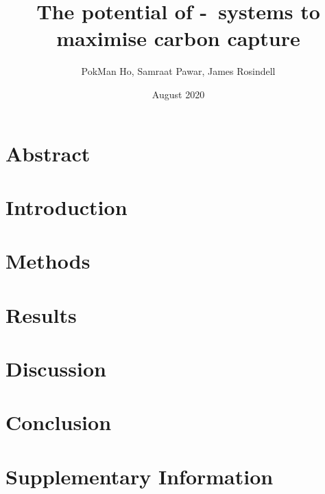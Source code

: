 \documentclass[sec/env.tex]{subfiles}
\title{The potential of \phy-\bac\ systems to maximise carbon capture}
\author{PokMan Ho, Samraat Pawar, James Rosindell}
\date{August 2020}
\begin{document}
\maketitle
\section{Abstract}
\section{Introduction}
\section{Methods}
\section{Results}
\section{Discussion}
\section{Conclusion}


\nocite{*}\printbibliography
\clearpage
\section{Supplementary Information}\beginSupp
%

\end{document}
